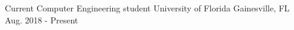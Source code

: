 \begin{cventries}
  \cventry
    {Current Computer Engineering student}
    {University of Florida}
    {Gainesville, FL}
    {Aug. 2018 - Present}
    {}
\end{cventries}
